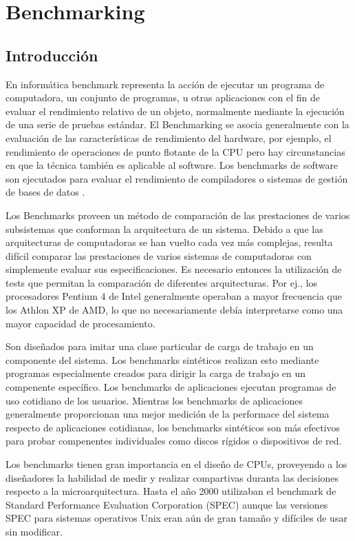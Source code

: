 \chapter{Benchmarking}
	\section{Introducción}
	En informática benchmark representa la acción de ejecutar un programa de computadora, un conjunto de programas, u otras aplicaciones con el fin
	de evaluar el rendimiento relativo de un objeto, normalmente mediante la ejecución de una serie de pruebas estándar.  El Benchmarking se asocia
	generalmente con la evaluación de las características de rendimiento del hardware, por ejemplo, el rendimiento de operaciones de punto flotante de la
	CPU pero hay circunstancias en que la técnica también es aplicable al software. Los benchmarks de software son ejecutados para evaluar el
	rendimiento de compiladores o sistemas de gestión de bases de datos .
	
	Los Benchmarks proveen un método de comparación de las prestaciones de varios subsistemas que conforman la arquitectura de un sistema. Debido a que
	las arquitecturas de computadoras se han vuelto cada vez más complejas, resulta difícil comparar las prestaciones de varios sistemas de computadoras
	con simplemente evaluar sus especificaciones. Es necesario entonces la utilización de tests que permitan la comparación de diferentes arquitecturas.
	Por ej., los procesadores Pentium 4 de Intel generalmente operaban a mayor frecuencia que los Athlon XP de AMD, lo que no necesariamente debía
	interpretarse como una mayor capacidad de procesamiento.
	
	Son diseñados para imitar una clase particular de carga de trabajo en un componente del sistema. Los benchmarks sintéticos realizan esto mediante
	programas especialmente creados para dirigir la carga de trabajo en un compenente específico. Los benchmarks de aplicaciones ejecutan programas
	de uso cotidiano de los usuarios. Mientras los benchmarks de aplicaciones generalmente proporcionan una mejor medición de la performace del sistema
	respecto de aplicaciones cotidianas, los benchmarks sintéticos son más efectivos para probar compenentes individuales como discos rígidos o
	dispositivos de red.
	
	Los benchmarks tienen gran importancia en el diseño de CPUs, proveyendo a los diseñadores la habilidad de medir y realizar compartivas duranta las
	decisiones respecto a la microarquitectura. Hasta el año 2000 utilizaban el benchmark de Standard Performance Evaluation Corporation (SPEC) aunque
	las versiones SPEC para sistemas operativos Unix eran aún de gran tamaño y difíciles de usar sin modificar.
	

